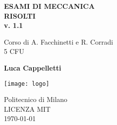 \begin{titlepage}
    \begin{center}
        \vspace*{1em}
        
        \textbf{\large{ESAMI DI MECCANICA}}\\
        \textbf{\small{RISOLTI}}\\
        \textbf{\small{v. 1.1}}
        
        \vspace{1em}
        Corso di A. Facchinetti e R. Corradi\\
        \small{5 CFU}
        
        \vspace{1em}
        
        \textbf{Luca Cappelletti}
        
        \vfill
                
         \vspace{1em}
        
        \texttt{[image: logo]}
        
         \vspace{1em}

        Politecnico di Milano\\
        LICENZA MIT \\
        \today
        
    \end{center}
\end{titlepage}